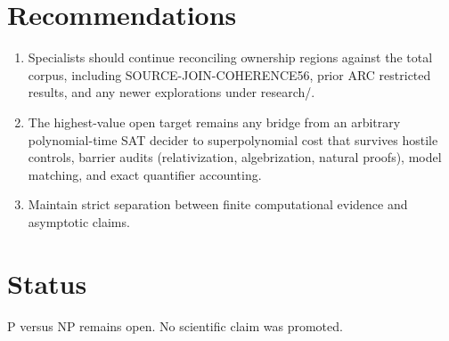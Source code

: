 \documentclass[11pt]{article}
\begin{document}
\section{Recommendations}
\begin{enumerate}
\item Specialists should continue reconciling ownership regions against the total corpus, including SOURCE-JOIN-COHERENCE56, prior ARC restricted results, and any newer explorations under research/.
\item The highest-value open target remains any bridge from an arbitrary polynomial-time SAT decider to superpolynomial cost that survives hostile controls, barrier audits (relativization, algebrization, natural proofs), model matching, and exact quantifier accounting.
\item Maintain strict separation between finite computational evidence and asymptotic claims.
\end{enumerate}

\section{Status}
P versus NP remains open. No scientific claim was promoted.

\end{document}
